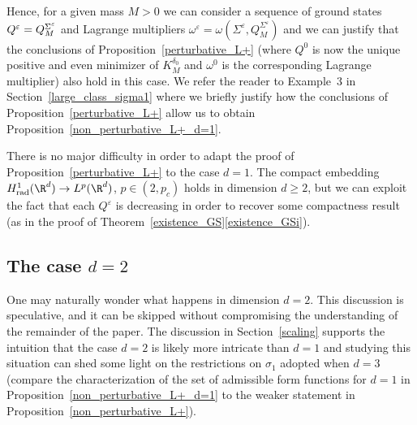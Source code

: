 Hence, for a given mass $M>0$ we can consider a sequence of ground states $Q^{\varepsilon}=\nobreak Q_{M}^{\Sigma^{\varepsilon}}$ and Lagrange multipliers $\omega^{\varepsilon}=\omega(\Sigma^{\varepsilon},Q_{M}^{\Sigma^{\varepsilon}})$ and we can justify that the conclusions of Proposition~\ref{perturbative_L+} (where $Q^{0}$ is now the unique positive and even minimizer of $K_{M}^{\delta_{0}}$ and $\omega^{0}$ is the corresponding Lagrange multiplier) also hold in this case. We refer the reader to Example~3 in Section~\ref{large_class_sigma1} where we briefly justify how the conclusions of Proposition~\ref{perturbative_L+} allow us to obtain Proposition~\ref{non_perturbative_L+_d=1}.

\begin{rmk}
There is no major difficulty in order to adapt the proof of Proposition~\ref{perturbative_L+} to the case $d=1$.
The compact embedding $H_\mathrm{rad}^{1}(\R^{d})\to L^{p}(\R^{d})$, $p\in(2,p_{c})$ holds in dimension $d\geq 2$,
but we can exploit the fact that each $Q^{\varepsilon}$ is decreasing in order to recover some compactness result
(as in the proof of Theorem~\ref{existence_GS}\eqref{existence_GSi}).
\end{rmk}

\subsection{The case $d=2$}

One may naturally wonder what happens in dimension \hbox{$d=2$}.
This discussion is speculative, and it can be skipped without compromising
the under\-standing of the remainder of the paper.
The discussion in Section~\ref{scaling} supports the intuition that the case $d=2$
is likely more intricate than $d=1$ and
studying this situation can shed some light
on the restrictions on $\sigma_{1}$
adopted when $d=3$ (compare the characterization of the set of admissible form functions for $d=1$ in Proposition~\ref{non_perturbative_L+_d=1}
to the weaker statement in Proposition~\ref{non_perturbative_L+}).

